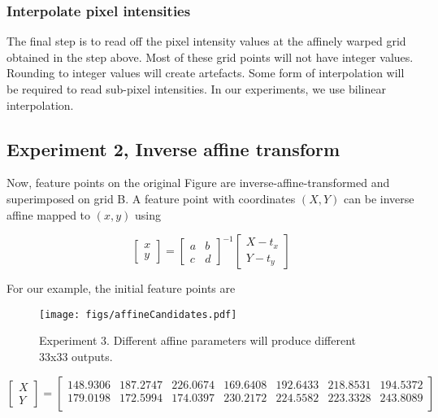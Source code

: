 \subsubsection{Interpolate pixel intensities}
The final step is to read off the pixel intensity values at the affinely warped grid obtained in the step above.  Most of these grid points will not have integer values.  Rounding to integer values will create artefacts.  Some form of interpolation will be required to read sub-pixel intensities.  In our experiments, we use bilinear interpolation. 


\subsection{Experiment 2, Inverse affine transform}
Now, feature points on the original Figure are inverse-affine-transformed and superimposed on grid B.  A feature point with coordinates $(X,Y)$ can be inverse affine mapped to $(x,y)$ using

\begin{equation}
\left[\begin{array}{ccc}
x 
\\ 
y
\end{array}
\right]
=
\left[\begin{array}{ccc}
a & b\\ 
c & d
\end{array}
\right]^{-1}
\left[\begin{array}{ccc}
X - t_x  
\\ 
Y - t_y
\end{array}
\right]
\end{equation}

For our example, the initial feature points are 


								\begin{figure}[t]
								\centering
								\texttt{[image: figs/affineCandidates.pdf]}
								\caption{Experiment 3.  Different affine parameters will produce different 33x33 outputs.}
								\label{fig:experiment3}
								\end{figure}


\begin{equation*}
\left[\begin{array}{ccc}
X  
\\ 
Y
\end{array}
\right]=
\left[
\begin{array}{cccccccc}
148.9306 & 187.2747 & 226.0674 & 169.6408 & 192.6433 & 218.8531 & 194.5372\\
179.0198 & 172.5994 & 174.0397 & 230.2172 & 224.5582 & 223.3328 & 243.8089\\
\end{array}
\right]
\end{equation*}

